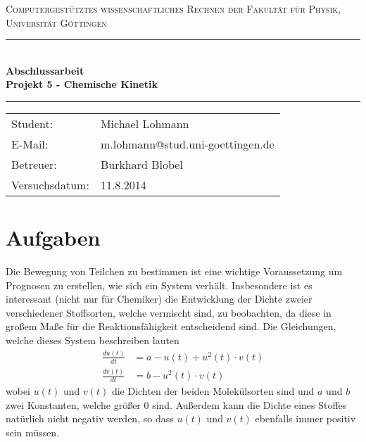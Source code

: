 \documentclass[12pt,a4paper,titlepage,headinclude,bibtotoc]{scrartcl}
\begin{document}
\begin{titlepage}
\centering
\textsc{\Large Computergestütztes wissenschaftliches Rechnen der Fakultät für
  Physik,\\[1.5ex] Universität Göttingen}

\vspace*{4.2cm}

\rule{\textwidth}{1pt}\\[0.5cm]
{\huge \bfseries
  Abschlussarbeit\\[1.5ex]
  Projekt 5 - Chemische Kinetik}\\[0.5cm]
\rule{\textwidth}{1pt}

\vspace*{3.5cm}

\begin{Large}
\begin{tabular}{ll}
Student: &  Michael Lohmann\\
E-Mail: & m.lohmann@stud.uni-goettingen.de\\
Betreuer: & Burkhard Blobel \\
Versuchsdatum: & 11.8.2014\\
\end{tabular}
\end{Large}

\vspace*{0.8cm}

\begin{Large}
\end{Large}

\end{titlepage}

\tableofcontents

\newpage

\section{Aufgaben}
Die Bewegung von Teilchen zu bestimmen ist eine wichtige Voraussetzung um Prognosen zu erstellen, wie sich ein System verhält.
Insbesondere ist es interessant (nicht nur für Chemiker) die Entwicklung der Dichte zweier verschiedener Stoffsorten, welche vermischt sind, zu beobachten, da diese in großem Maße für die Reaktionsfähigkeit entscheidend sind.
Die Gleichungen, welche dieses System beschreiben lauten
\begin{align}
\frac{du(t)}{dt}&=a-u(t)+u^2(t)\cdot v(t)\\
\frac{dv(t)}{dt}&=b-u^2(t)\cdot v(t)
\end{align}
wobei $u(t)$ und $v(t)$ die Dichten der beiden Molekülsorten sind und $a$ und $b$ zwei Konstanten, welche größer 0 sind. Außerdem kann die Dichte eines Stoffes natürlich nicht negativ werden, so dass $u(t)$ und $v(t)$ ebenfalls immer positiv sein müssen.\\
\end{document}
